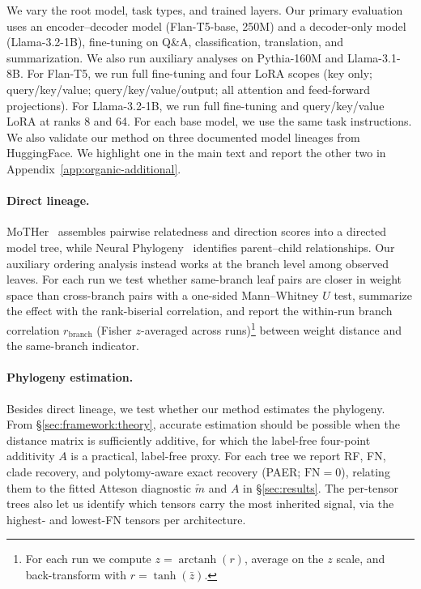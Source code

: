 \documentclass{article}
\theoremstyle{definition}
\theoremstyle{plain}
\begin{document}
We vary the root model, task types, and trained layers. Our primary evaluation uses an
encoder--decoder model (Flan-T5-base, 250M) and a decoder-only model (Llama-3.2-1B), fine-tuning on
Q\&A, classification, translation, and summarization. We also run auxiliary analyses on Pythia-160M and Llama-3.1-8B. For Flan-T5, we run full fine-tuning and four LoRA \citep{hu2022lora}
scopes (key only; query/key/value; query/key/value/output; all attention and feed-forward projections).
For Llama-3.2-1B, we run full fine-tuning and query/key/value LoRA at ranks 8 and 64. For each base
model, we use the same task instructions. We also
validate our method on three documented model lineages from HuggingFace. We highlight one in the
main text and report the other two in Appendix~\ref{app:organic-additional}.

\paragraph{Direct lineage.}
MoTHer~\citep{horwitz2025mother} assembles pairwise relatedness and direction scores into a directed
model tree, while Neural Phylogeny~\citep{yu2025neural} identifies parent--child relationships. Our
auxiliary ordering analysis instead works at the branch level among observed leaves. For each run we test whether same-branch leaf pairs are closer in weight space than cross-branch pairs with a one-sided Mann--Whitney $U$ test, summarize the effect with the rank-biserial correlation, and report the within-run branch correlation $r_{\mathrm{branch}}$ (Fisher $z$-averaged across runs)\footnote{For each run we compute $z=\operatorname{arctanh}(r)$, average on the $z$ scale, and back-transform with $r=\tanh(\bar z)$.} between weight distance and the same-branch indicator.

\paragraph{Phylogeny estimation.}
\label{sec:exp:weights}
Besides direct lineage, we test whether our method estimates the phylogeny. From \S\ref{sec:framework:theory}, accurate estimation should be possible when the distance matrix is sufficiently additive, for which the label-free four-point additivity $A$ is a practical, label-free proxy. For each tree we report RF, FN, clade recovery, and polytomy-aware exact recovery (PAER; $\mathrm{FN}=0$), relating them to the fitted Atteson diagnostic $\widetilde m$ and $A$ in \S\ref{sec:results}. The per-tensor trees also let us identify which tensors carry the most inherited signal, via the highest- and lowest-FN tensors per architecture.
\end{document}

